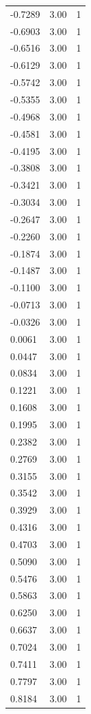 \begin{longtable}{lrr}
  -0.7289 & 3.00 & 1 \\
  -0.6903 & 3.00 & 1 \\
  -0.6516 & 3.00 & 1 \\
  -0.6129 & 3.00 & 1 \\
  -0.5742 & 3.00 & 1 \\
  -0.5355 & 3.00 & 1 \\
  -0.4968 & 3.00 & 1 \\
  -0.4581 & 3.00 & 1 \\
  -0.4195 & 3.00 & 1 \\
  -0.3808 & 3.00 & 1 \\
  -0.3421 & 3.00 & 1 \\
  -0.3034 & 3.00 & 1 \\
  -0.2647 & 3.00 & 1 \\
  -0.2260 & 3.00 & 1 \\
  -0.1874 & 3.00 & 1 \\
  -0.1487 & 3.00 & 1 \\
  -0.1100 & 3.00 & 1 \\
  -0.0713 & 3.00 & 1 \\
  -0.0326 & 3.00 & 1 \\
  0.0061 & 3.00 & 1 \\
  0.0447 & 3.00 & 1 \\
  0.0834 & 3.00 & 1 \\
  0.1221 & 3.00 & 1 \\
  0.1608 & 3.00 & 1 \\
  0.1995 & 3.00 & 1 \\
  0.2382 & 3.00 & 1 \\
  0.2769 & 3.00 & 1 \\
  0.3155 & 3.00 & 1 \\
  0.3542 & 3.00 & 1 \\
  0.3929 & 3.00 & 1 \\
  0.4316 & 3.00 & 1 \\
  0.4703 & 3.00 & 1 \\
  0.5090 & 3.00 & 1 \\
  0.5476 & 3.00 & 1 \\
  0.5863 & 3.00 & 1 \\
  0.6250 & 3.00 & 1 \\
  0.6637 & 3.00 & 1 \\
  0.7024 & 3.00 & 1 \\
  0.7411 & 3.00 & 1 \\
  0.7797 & 3.00 & 1 \\
  0.8184 & 3.00 & 1 \\

\end{longtable}
